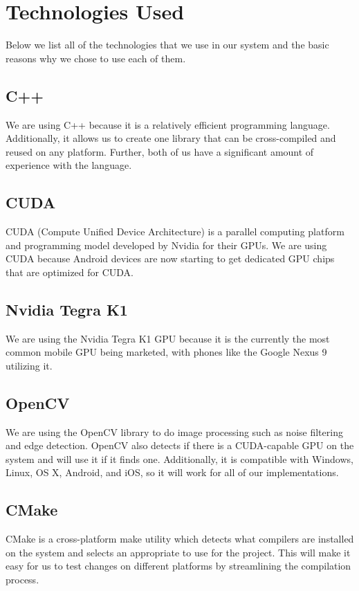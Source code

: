 \chapter{Technologies Used}
\label{technologies}

Below we list all of the technologies that we use in our system and the basic reasons why we chose to use each of them.

\section{C++}

We are using C++ because it is a relatively efficient programming language. Additionally, it allows us to create one library that can be cross-compiled and reused on any platform. Further, both of us have a significant amount of experience with the language.

\section{CUDA}

CUDA (Compute Unified Device Architecture) is a parallel computing platform and programming model developed by Nvidia for their GPUs.
We are using CUDA because Android devices are now starting to get dedicated GPU chips that are optimized for CUDA.

\section{Nvidia Tegra K1}

We are using the Nvidia Tegra K1 GPU because it is the currently the most common mobile GPU being marketed, with phones like the Google Nexus 9 utilizing it.

\section{OpenCV}

We are using the OpenCV library to do image processing such as noise filtering and edge detection. 
OpenCV also detects if there is a CUDA-capable GPU on the system and will use it if it finds one.
Additionally, it is compatible with Windows, Linux, OS X, Android, and iOS, so it will work for all of our implementations.

\section{CMake}

CMake is a cross-platform make utility which detects what compilers are installed on the system and selects an appropriate to use for the project. 
This will make it easy for us to test changes on different platforms by streamlining the compilation process.